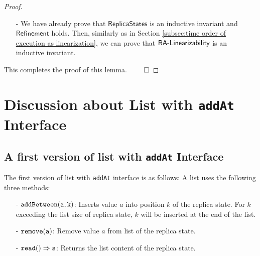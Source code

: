 \begin {proof}
\begin{itemize}
\begin{itemize}
    \item[-] Assume we do $\alabellong[{\tt read}]{}{s}{}$ on replica state $\sigma$. Assume $\sigma = \{w_1,\ldots,w_n\}$, and for each $i$, $w_i = (v_i,tid_i,gv_i)$. Then, $s$ is obtained by walking $\sigma$ and read value of each T-characters according to the T-identifier order $<_t$ of $\sigma$, and ignoring all $nil$. Assume $\refmap(\sigma) = (l,T)$. We can see that $l$ is obtained by walking $\sigma$ and read ghost value of each T-characters according to the T-identifier order $<_t$ of $\sigma$, and $T = \{ gv_i \vert v_i = nil \}$. Thus, we have $\refmap(\sigma) \specarrow{\alabellong[{\tt read}]{}{s}{}} \refmap(\sigma)$.
    \end{itemize}

\item[-] We have already prove that $\mathsf{ReplicaStates}$ is an inductive invariant and $\mathsf{Refinement}$ holds. Then, similarly as in Section \ref{subsec:time order of execution as linearization}, we can prove that $\mathsf{RA\text{-}Linearizability{}}$ is an inductive invariant.
\end{itemize}

This completes the proof of this lemma. $\qed$
\end {proof}











\section{Discussion about List with {\tt addAt} Interface}
\label{sec:discussion about list with addAt interface}



\subsection{A first version of list with {\tt addAt} Interface} 
\label{subsec:a first version of list with addAt interface} 

The first version of list with {\tt addAt} interface is as follows: A list uses the following three methods: 

\begin{itemize}
\setlength{\itemsep}{0.5pt}
\item[-] $\alabelshort[{\tt addBetween}]{a,k}$: Inserts value $a$ into position $k$ of the replica state. For $k$ exceeding the list size of replica state, $k$ will be inserted at the end of the list.

\item[-] $\alabelshort[{\tt remove}]{a}$: Remove value $a$ from list of the replica state.

\item[-] $\alabellong[{\tt read}]{}{s}{}$: Returns the list content of the replica state.
\end{itemize} 

